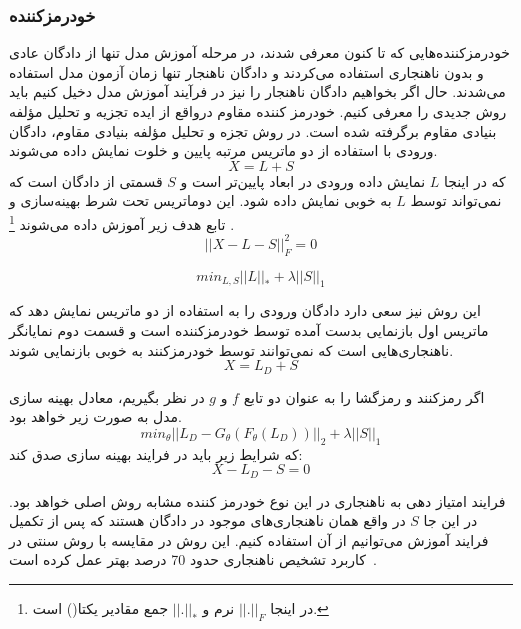 \documentclass[12pt,a4paper]{report}
\theoremstyle{definition}
\theoremstyle{definition}
\begin{document}
\subsubsection{خودرمزکننده }
خودرمزکننده‌هایی که تا کنون معرفی شدند، در مرحله آموزش مدل تنها از دادگان عادی و بدون ناهنجاری استفاده می‌کردند و دادگان ناهنجار تنها زمان آزمون مدل استفاده می‌شدند. حال اگر بخواهیم دادگان ناهنجار را نیز در فرآیند آموزش مدل دخیل کنیم باید روش جدیدی را معرفی کنیم. خودرمز کننده مقاوم درواقع از ایده تجزیه و تحلیل مؤلفه بنیادی مقاوم برگرفته شده است. در روش تجزه و تحلیل مؤلفه 
بنیادی مقاوم، دادگان ورودی با استفاده از دو ماتریس مرتبه پایین و خلوت نمایش داده می‌شوند.
\begin{equation}
	X = L + S
\end{equation}
که در اینجا $L$ نمایش داده ورودی در ابعاد پایین‌تر است و $S$ قسمتی از دادگان است که نمی‌تواند توسط $L$ به خوبی نمایش داده شود. این دوماتریس تحت شرط بهینه‌سازی و تابع هدف زیر آموزش داده می‌شوند
\footnote{
در اینجا
 $||.||_F$ 
نرم  و 
$||.||_*$
 جمع مقادیر یکتا() است.
}
.
\begin{equation}
	||X-L-S||_F^2 = 0
\end{equation}

\begin{equation}
	min_{L,S} ||L||_* + \lambda||S||_1
\end{equation}

این روش نیز سعی دارد دادگان ورودی را به استفاده از دو ماتریس نمایش دهد که ماتریس اول بازنمایی بدست آمده توسط خودرمزکننده است و قسمت دوم نمایانگر ناهنجاری‌هایی است که نمی‌توانند توسط خودرمزکنند به خوبی بازنمایی شوند.
\begin{equation}
X = L_D + S
\end{equation}

اگر رمزکنند و رمزگشا را به عنوان دو تابع $f$ و $g$ در نظر بگیریم، معادل بهینه سازی مدل به صورت زیر خواهد بود.
\begin{equation}
	min_{\theta} || L_D - G_\theta(F_\theta(L_D)) ||_2 + \lambda ||S||_1
\end{equation}
که شرایط زیر باید در فرایند بهینه سازی صدق کند:
\begin{equation}
X-L_D-S=0
\end{equation}

فرایند امتیاز دهی به ناهنجاری در این نوع خودرمز کننده مشابه روش اصلی خواهد بود. در این جا $S$ در واقع همان ناهنجاری‌های موجود در دادگان هستند که پس از تکمیل فرایند آموزش می‌توانیم از آن استفاده کنیم. این روش در مقایسه با روش سنتی در کاربرد تشخیص ناهنجاری حدود 70 درصد بهتر عمل کرده است~\cite{10.1145/3097983.3098052}.\\
\end{document}
